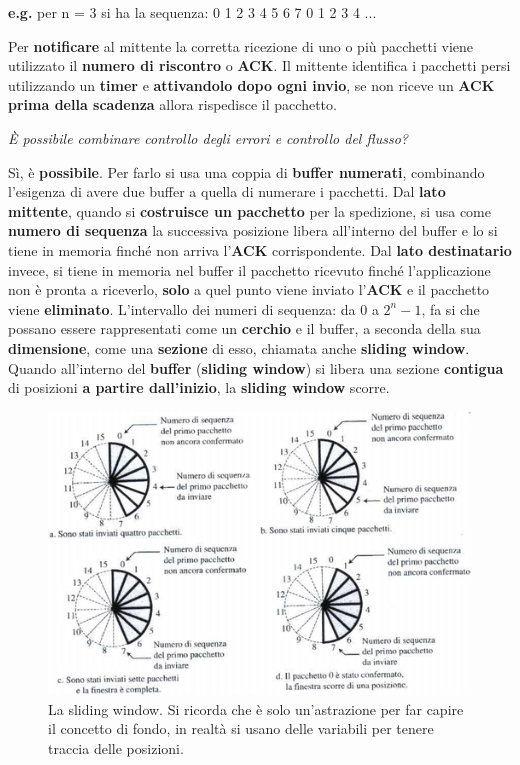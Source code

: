 \documentclass[11pt,a4paper,oneside]{book}
\theoremstyle{definition}
\begin{document}
\begin{center}
	\textbf{e.g.} per n = 3 si ha la sequenza: 0 1 2 3 4 5 6 7 0 1 2 3 4 ...
\end{center}
Per \textbf{notificare} al mittente la corretta ricezione di uno o più pacchetti viene utilizzato il \textbf{numero di riscontro} o \textbf{ACK}. Il mittente identifica i pacchetti persi utilizzando un \textbf{timer} e \textbf{attivandolo dopo ogni invio}, se non riceve un \textbf{ACK prima della scadenza} allora rispedisce il pacchetto.

\pagebreak

\begin{flushleft}
	\textit{È possibile combinare controllo degli errori e controllo del flusso?}
\end{flushleft}
Sì, è \textbf{possibile}. Per farlo si usa una coppia di \textbf{buffer numerati}, combinando l'esigenza di avere due buffer a quella di numerare i pacchetti.
Dal \textbf{lato mittente}, quando si \textbf{costruisce un pacchetto} per la spedizione, si usa come \textbf{numero di sequenza} la successiva posizione libera all'interno del buffer e lo si tiene in memoria finché non arriva l'\textbf{ACK} corrispondente. Dal \textbf{lato destinatario} invece, si tiene in memoria nel buffer il pacchetto ricevuto finché l'applicazione non è pronta a riceverlo, \textbf{solo} a quel punto viene inviato l'\textbf{ACK} e il pacchetto viene \textbf{eliminato}. L'intervallo dei numeri di sequenza: da 0 a $2^n - 1$, fa si che possano essere rappresentati come un \textbf{cerchio} e il buffer, a seconda della sua \textbf{dimensione}, come una \textbf{sezione} di esso, chiamata anche \textbf{sliding window}. Quando all'interno del \textbf{buffer} (\textbf{sliding window}) si libera una sezione \textbf{contigua} di posizioni \textbf{a partire dall'inizio}, la \textbf{sliding window} scorre.
\begin{figure}[!h]
	\includegraphics[scale=0.75]{Immagini/Sliding_w.png}
	\centering
	\caption{La sliding window. Si ricorda che è solo un'astrazione per far capire il concetto di fondo, in realtà si usano delle variabili per tenere traccia delle posizioni.}
\end{figure}
\end{document}
